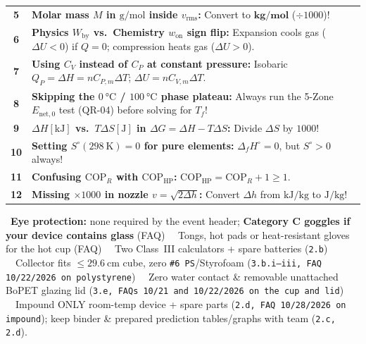 \documentclass[10pt,twoside,openany,letterpaper]{book}
\begin{document}
\begin{quicksheet}
\begin{twocol}[0.51]
\begin{trapbox}
\begin{tabularx}{\linewidth}{@{}c X@{}}
\textbf{5} & \textbf{Molar mass $M$ in $\si{\gram\per\mole}$ inside $v_{\mathrm{rms}}$:} Convert to $\mathbf{\si{\kilogram\per\mole}}$ ($\div 1000$)! \\
\textbf{6} & \textbf{Physics $W_{\mathrm{by}}$ vs.\ Chemistry $w_{\mathrm{on}}$ sign flip:} Expansion cools gas ($\Delta U < 0$) if $Q=0$; compression heats gas ($\Delta U > 0$). \\
\textbf{7} & \textbf{Using $C_V$ instead of $C_P$ at constant pressure:} Isobaric $Q_P = \Delta H = nC_{P,m}\Delta T$; $\Delta U = nC_{V,m}\Delta T$. \\
\textbf{8} & \textbf{Skipping the $\SI{0}{\celsius}$ / $\SI{100}{\celsius}$ phase plateau:} Always run the 5-Zone $E_{\mathrm{net},0}$ test (QR-04) before solving for $T_f$! \\
\textbf{9} & \textbf{$\Delta H[\si{\kilo\joule}]$ vs.\ $T\Delta S[\si{\joule}]$ in $\Delta G = \Delta H - T\Delta S$:} Divide $\Delta S$ by $1000$! \\
\textbf{10} & \textbf{Setting $S^\circ(\SI{298}{\kelvin}) = 0$ for pure elements:} $\Delta_f H^\circ = 0$, but $S^\circ > 0$ always! \\
\textbf{11} & \textbf{Confusing $\mathrm{COP}_R$ with $\mathrm{COP}_{\mathrm{HP}}$:} $\mathrm{COP}_{\mathrm{HP}} = \mathrm{COP}_R + 1 \ge 1$. \\
\textbf{12} & \textbf{Missing $\times 1000$ in nozzle $v = \sqrt{2\Delta h}$:} Convert $\Delta h$ from $\si{\kilo\joule\per\kilogram}$ to $\si{\joule\per\kilogram}$! \\
\bottomrule
\end{tabularx}
\end{trapbox}
\begin{rulebox}
\scriptsize
{}\ \textbf{Eye protection:} none required by the event header; \textbf{Category C goggles if your device contains glass} (FAQ) \textbar\ \ Tongs, hot pads or heat-resistant gloves for the hot cup (FAQ) \textbar\ \ Two Class~III calculators + spare batteries (\texttt{2.b}) \textbar\ \ Collector fits $\le\SI{29.6}{\centi\meter}$ cube, zero \texttt{\#6 PS}/Styrofoam (\texttt{3.b.i--iii, FAQ 10/22/2026 on polystyrene}) \textbar\ \ Zero water contact \& removable unattached BoPET glazing lid (\texttt{3.e, FAQs 10/21 and 10/22/2026 on the cup and lid}) \textbar\ \ Impound ONLY room-temp device + spare parts (\texttt{2.d, FAQ 10/28/2026 on impound}); keep binder \& prepared prediction tables/graphs with team (\texttt{2.c, 2.d}).
\end{rulebox}
\end{twocol}
\label{LastContentPage}
\end{quicksheet}
\end{document}
